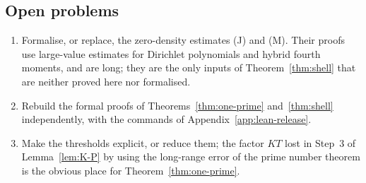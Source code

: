 \subsection{Open problems}
\begin{enumerate}
\item Formalise, or replace, the zero-density estimates (J) and (M). Their proofs use large-value estimates for Dirichlet polynomials and hybrid fourth moments, and are
long; they are the only inputs of Theorem~\ref{thm:shell} that are neither proved here nor formalised.
\item Rebuild the formal proofs of Theorems~\ref{thm:one-prime} and~\ref{thm:shell} independently, with the commands of
Appendix~\ref{app:lean-release}.
\item Make the thresholds explicit, or reduce them; the factor $KT$ lost in Step~3 of Lemma~\ref{lem:K-P} by using the long-range error of the prime number theorem is
the obvious place for Theorem~\ref{thm:one-prime}.
\end{enumerate}
